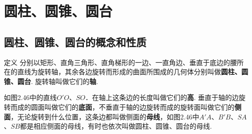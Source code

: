 
\section{圆柱、圆锥、圆台}
\subsection{圆柱、圆锥、圆台的概念和性质}

\begin{thm}
    {定义} 分别以矩形、直角三角形、直角梯形的一边、一直角边、垂直于底边的腰所在的直线为旋转轴，其余各边旋转而形成的曲面所围成的几何体分别叫做\textbf{圆柱、圆锥、圆台}. 旋转轴叫做它们的\textbf{轴}.
\end{thm}

如图2.46中的直线$O'O$、$SO$．在轴上这条边的长度叫做它们的\textbf{高}. 垂直于轴的边旋转而成的圆面叫做它们的\textbf{底面}，不垂直于轴的边旋转而成的旋转面叫做它们的\textbf{侧面}，无论旋转到什么位置，这条边都叫做侧面的\textbf{母线}，如图2.46中$A'A$、$B'B$、$SA$、$SB$都是相应侧面的母线，有时也依次叫做圆柱、圆锥、圆台的母线.

